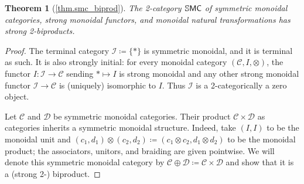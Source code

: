 \documentclass[11pt, oneside, article]{memoir}
\theoremstyle{plain}
\newtheorem*{theorem*}{Theorem}
\theoremstyle{definition}
\theoremstyle{remark}
\newcommand{\cat}[1]{\mathcal{#1}}%
\newcommand{\Cat}[1]{{\mathsf{#1}}}%
\newcommand{\CCat}[1]{\mathbb{\StrLeft{#1}{1}}\Cat{\StrGobbleLeft{#1}{1}}}%
\newcommand{\ssmc}{\CCat{SMC}}
\newcommand{\zero}{\cat{I}}
\begin{document}
\begin{theorem*}[\ref{thm.smc_biprod}]\label{page.smc_biprod}
The 2-category $\ssmc$ of symmetric monoidal categories, strong monoidal functors, and monoidal natural transformations has strong 2-biproducts.
\end{theorem*}
\begin{proof}
The terminal category $\zero\coloneqq\{*\}$ is symmetric monoidal, and it is terminal as such. It is also strongly initial: for every monoidal category $(\cat{C},I,\otimes)$, the functor $I\colon\zero\to\cat{C}$ sending $*\mapsto I$ is strong monoidal and any other strong monoidal functor $\zero\to\cat{C}$ is (uniquely) isomorphic to $I$. Thus $\cat{I}$ is a 2-categorically a zero object.

Let $\cat{C}$ and $\cat{D}$ be symmetric monoidal categories. Their product $\cat{C}\times\cat{D}$ as categories inherits a symmetric monoidal structure. Indeed, take $(I,I)$ to be the monoidal unit and $(c_1,d_1)\otimes(c_2,d_2)\coloneqq(c_1\otimes c_2,d_1\otimes d_2)$ to be the monoidal product; the associators, unitors, and braiding are given pointwise. We will denote this symmetric monoidal category by $\cat{C}\oplus\cat{D}\coloneqq\cat{C}\times\cat{D}$ and show that it is a (strong 2-) biproduct.


\end{proof}
\end{document}
